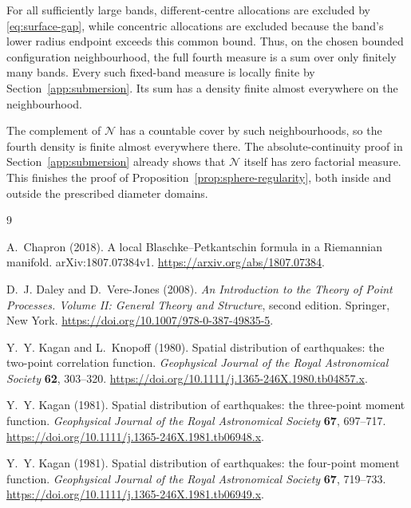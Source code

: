 \documentclass[11pt,a4paper]{article}
\numberwithin{equation}{section}
\theoremstyle{definition}
\theoremstyle{remark}
\begin{document}
For all sufficiently large bands, different-centre allocations are
excluded by \eqref{eq:surface-gap}, while concentric allocations are
excluded because the band's lower radius endpoint exceeds this common
bound. Thus, on the chosen bounded configuration neighbourhood, the full
fourth measure is a sum over only finitely many bands. Every such
fixed-band measure is locally finite by
Section~\ref{app:submersion}. Its sum has a density finite almost
everywhere on the neighbourhood.

The complement of $\mathcal N$ has a countable cover by such
neighbourhoods, so the fourth density is finite almost everywhere there.
The absolute-continuity proof in Section~\ref{app:submersion} already
shows that $\mathcal N$ itself has zero factorial measure. This finishes
the proof of Proposition~\ref{prop:sphere-regularity}, both inside and
outside the prescribed diameter domains.

\begin{thebibliography}{9}

A.~Chapron (2018).
\newblock A local Blaschke--Petkantschin formula in a Riemannian manifold.
\newblock arXiv:1807.07384v1.
\newblock \url{https://arxiv.org/abs/1807.07384}.

D.~J. Daley and D.~Vere-Jones (2008).
\newblock \emph{An Introduction to the Theory of Point Processes.
Volume II: General Theory and Structure}, second edition.
\newblock Springer, New York.
\newblock \url{https://doi.org/10.1007/978-0-387-49835-5}.

Y.~Y. Kagan and L.~Knopoff (1980).
\newblock Spatial distribution of earthquakes: the two-point correlation function.
\newblock \emph{Geophysical Journal of the Royal Astronomical Society}
\textbf{62}, 303--320.
\newblock \url{https://doi.org/10.1111/j.1365-246X.1980.tb04857.x}.

Y.~Y. Kagan (1981).
\newblock Spatial distribution of earthquakes: the three-point moment function.
\newblock \emph{Geophysical Journal of the Royal Astronomical Society}
\textbf{67}, 697--717.
\newblock \url{https://doi.org/10.1111/j.1365-246X.1981.tb06948.x}.

Y.~Y. Kagan (1981).
\newblock Spatial distribution of earthquakes: the four-point moment function.
\newblock \emph{Geophysical Journal of the Royal Astronomical Society}
\textbf{67}, 719--733.
\newblock \url{https://doi.org/10.1111/j.1365-246X.1981.tb06949.x}.

\end{thebibliography}
\end{document}
